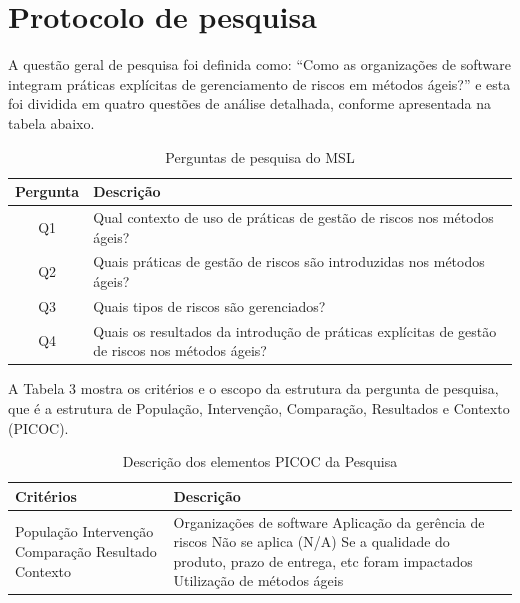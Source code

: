 \documentclass[
	12pt,
	openright,
	twoside,
	a4paper,
	english,
	brazil
	]{abntex2}
\begin{document}
\section{Protocolo de pesquisa}

A questão geral de pesquisa foi definida como: “Como as organizações de software integram práticas explícitas de gerenciamento de riscos em métodos ágeis?” e esta foi dividida em quatro questões de análise detalhada, conforme apresentada na tabela abaixo.

\begin{table}[h!]
  \caption{Perguntas de pesquisa do MSL}
  \centering
  \begin{tabular}{|c|p{10cm}|}
  \hline
  \textbf{Pergunta} & \textbf{Descrição} \\ \hline
  Q1 & Qual contexto de uso de práticas de gestão de riscos nos métodos ágeis? \\ \hline
  Q2 & Quais práticas de gestão de riscos são introduzidas nos métodos ágeis? \\ \hline
  Q3 & Quais tipos de riscos são gerenciados? \\ \hline
  Q4 & Quais os resultados da introdução de práticas explícitas de gestão de riscos nos métodos ágeis? \\ \hline
  \end{tabular}
  \label{tab:perguntas-msl}
\end{table}

A Tabela 3 \cite{kitchenham2007guidelines} mostra os critérios e o escopo da estrutura da pergunta de pesquisa, que é a estrutura de População, Intervenção, Comparação, Resultados e Contexto (PICOC).

\begin{table}[h!]
  \centering
  \caption{Descrição dos elementos PICOC da Pesquisa}
  \begin{tabular}{|p{5cm}|p{10cm}|}
  \hline
  \textbf{Critérios} & \textbf{Descrição} \\ \hline
  População \newline Intervenção \newline Comparação \newline Resultado \newline Contexto 
  & Organizações de software \newline Aplicação da gerência de riscos \newline Não se aplica (N/A) \newline Se a qualidade do produto, prazo de entrega, etc foram impactados \newline Utilização de métodos ágeis \\ \hline
  \end{tabular}
  \label{tab:picoc}
\end{table}
\end{document}
